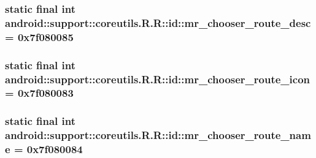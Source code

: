 \hypertarget{classandroid_1_1support_1_1coreutils_1_1_r_1_1id_f1e6fe1ccfc2a45681a21aa922b76c53}{
\subsubsection[{mr\_\-chooser\_\-route\_\-desc}]{\setlength{\rightskip}{0pt plus 5cm}static final int android::support::coreutils.R.R::id::mr\_\-chooser\_\-route\_\-desc = 0x7f080085}}
\label{classandroid_1_1support_1_1coreutils_1_1_r_1_1id_f1e6fe1ccfc2a45681a21aa922b76c53}


\hypertarget{classandroid_1_1support_1_1coreutils_1_1_r_1_1id_ee579d36cd5490e856558b17af423c4d}{
\subsubsection[{mr\_\-chooser\_\-route\_\-icon}]{\setlength{\rightskip}{0pt plus 5cm}static final int android::support::coreutils.R.R::id::mr\_\-chooser\_\-route\_\-icon = 0x7f080083}}
\label{classandroid_1_1support_1_1coreutils_1_1_r_1_1id_ee579d36cd5490e856558b17af423c4d}


\hypertarget{classandroid_1_1support_1_1coreutils_1_1_r_1_1id_c960e05011fac2a61b8c50697fd5612e}{
\subsubsection[{mr\_\-chooser\_\-route\_\-name}]{\setlength{\rightskip}{0pt plus 5cm}static final int android::support::coreutils.R.R::id::mr\_\-chooser\_\-route\_\-name = 0x7f080084}}
\label{classandroid_1_1support_1_1coreutils_1_1_r_1_1id_c960e05011fac2a61b8c50697fd5612e}


